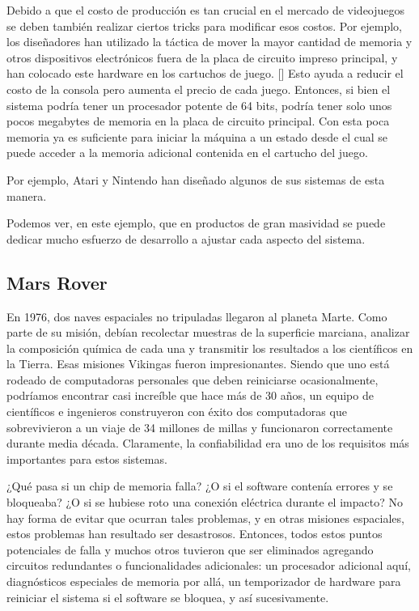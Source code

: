\documentclass[output=paper, 
colorlinks,
citecolor=brown,
newtxmath
]{langscibook}
\begin{document}
Debido a que el costo de producción es tan crucial en el mercado de videojuegos 
se deben también realizar ciertos tricks para modificar esos costos. Por ejemplo, los
diseñadores han utilizado la táctica de mover la mayor cantidad de memoria 
y otros dispositivos electrónicos fuera de la 
placa de circuito impreso principal, y han colocado este hardware en los cartuchos de juego. [] 
Esto ayuda a reducir el costo de la consola pero aumenta el precio de cada juego. 
Entonces, si bien el sistema podría tener un procesador potente de 64 bits, 
podría tener solo unos pocos megabytes de memoria en la placa de circuito principal. 
Con esta poca memoria ya es suficiente para iniciar 
la máquina a un estado desde el cual se puede acceder a la memoria adicional 
contenida en el cartucho del juego.

Por ejemplo, Atari y Nintendo han diseñado algunos de sus sistemas de esta manera.

Podemos ver, en este ejemplo, que en productos de gran masividad se puede dedicar 
mucho esfuerzo de desarrollo a ajustar cada aspecto del sistema.





\subsection {Mars Rover}

En 1976, dos naves espaciales no tripuladas llegaron al planeta Marte. 
Como parte de su misión, debían recolectar muestras de la superficie marciana, 
analizar la composición química de cada una y transmitir los resultados a los 
científicos en la Tierra. Esas misiones Vikingas fueron impresionantes. 
Siendo que uno está rodeado de computadoras personales que deben reiniciarse 
ocasionalmente, podríamos encontrar casi increíble que hace más de 30 años, 
un equipo de científicos e ingenieros construyeron con éxito dos computadoras 
que sobrevivieron a un viaje de 34 millones de millas y funcionaron 
correctamente durante media década. 
Claramente, la confiabilidad era uno de los requisitos más importantes para estos sistemas.

¿Qué pasa si un chip de memoria falla? ¿O si el software contenía errores y se bloqueaba? 
¿O si se hubiese roto una conexión eléctrica durante el impacto? 
No hay forma de evitar que ocurran tales problemas, y en otras misiones espaciales, 
estos problemas han resultado ser desastrosos. 
Entonces, todos estos puntos potenciales de falla y muchos otros 
tuvieron que ser eliminados agregando circuitos redundantes o 
funcionalidades adicionales:
un procesador adicional aquí, diagnósticos especiales de memoria por allá, 
un temporizador de hardware para reiniciar el sistema si el software se 
bloquea, y así sucesivamente.
\end{document}

